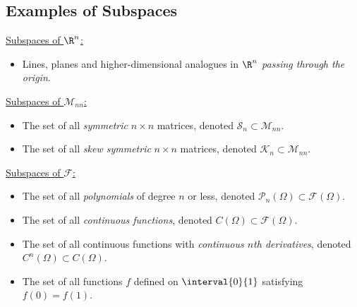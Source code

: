\documentclass{article}
\begin{document}
\begin{multicols*}{3}
    \subsection{Examples of Subspaces}
    \underline{Subspaces of \(\R^n\):}
    \begin{itemize}
        \item Lines, planes and higher-dimensional analogues in
              \(\R^n\) \emph{passing through the origin}.
    \end{itemize}
    \underline{Subspaces of \(\mathscr{M}_{nn}\):}
    \begin{itemize}
        \item The set of all \emph{symmetric} \(n \times n\) matrices,
              denoted \(\mathscr{S}_n \subset \mathscr{M}_{nn}\).
        \item The set of all \emph{skew symmetric} \(n \times n\)
              matrices, denoted \(\mathscr{K}_n \subset
              \mathscr{M}_{nn}\).
    \end{itemize}
    \underline{Subspaces of \(\mathscr{F}\):}
    \begin{itemize}
        \item The set of all \emph{polynomials} of degree \(n\) or
              less, denoted \(\mathscr{P}_n\left( \Omega \right)
              \subset \mathscr{F}\left( \Omega \right)\).
        \item The set of all \emph{continuous functions}, denoted
              \(C\left( \Omega \right) \subset \mathscr{F}\left( \Omega
              \right)\).
        \item The set of all continuous functions with \emph{continuous
              \(n\)th derivatives}, denoted \(C^n\left( \Omega \right)
              \subset C\left( \Omega \right)\).
        \item The set of all functions \(f\) defined on
              \(\interval{0}{1}\) satisfying \(f\left( 0 \right) =
              f\left( 1 \right)\).
    \end{itemize}

\end{multicols*}
\end{document}
